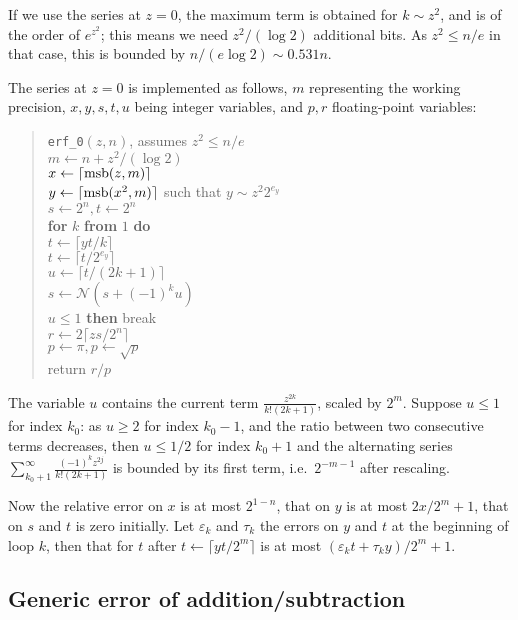 \documentclass[12pt]{amsart}
\def\q{\hspace*{5mm}}
\begin{document}
\medskip

If we use the series at $z=0$, the maximum term is obtained for
$k \sim z^2$, and is of the order of $e^{z^2}$; this means
we need $z^2/(\log 2)$ additional bits. As $z^2 \le n/e$ in that case,
this is bounded by $n/(e \log 2) \sim 0.531 n$.


The series at $z=0$ is implemented as follows, 
$m$ representing the working precision,
$x, y, s, t, u$ being integer variables, and $p, r$ floating-point
variables:
\begin{quote}
\verb|erf_0|$(z, n)$, assumes $z^2 \le n/e$ \\
$m \leftarrow n + z^2/(\log 2)$ \\
$x \leftarrow \lceil {\rm msb}(z, m) \rceil$ \\
$y \leftarrow \lceil {\rm msb}(x^2,m) \rceil$ such that $y \sim z^2 2^{e_y}$ \\
$s \leftarrow 2^n, t \leftarrow 2^n$ \\
{\bf for} $k$ {\bf from} $1$ {\bf do} \\
\q $t \leftarrow \lceil y t/k \rceil$ \\
\q $t \leftarrow \lceil t/2^{e_y} \rceil$ \\
\q $u \leftarrow \lceil t/(2k+1) \rceil$ \\
\q $s \leftarrow {\mathcal N}(s + (-1)^k u)$ \\
\q {\bf if} $u \le 1$ {\bf then} break \\
$r \leftarrow 2 \lceil z s/2^n \rceil$ \\
$p \leftarrow \pi, p \leftarrow \sqrt{p}$ \\
return $r/p$
\end{quote}
The variable $u$ contains the current term $\frac{z^{2k}}{k! (2k+1)}$,
scaled by $2^m$. Suppose $u \le 1$ for index $k_0$:
as $u \ge 2$ for index $k_0-1$, and the 
ratio between two consecutive terms decreases, then $u \le 1/2$ for index 
$k_0+1$ and the alternating series $\sum_{k_0+1}^{\infty} \frac{(-1)^k
z^{2j}}{k! (2k+1)}$
is bounded by its first term, i.e.~$2^{-m-1}$ after rescaling.

Now the relative error on $x$ is at most $2^{1-n}$,
that on $y$ is at most $2x/2^m + 1$,
that on $s$ and $t$ is zero initially.
Let $\varepsilon_k$ and $\tau_k$ the errors on $y$ and $t$
at the beginning of loop $k$,
then that for $t$ after $t \leftarrow \lceil y t/2^m \rceil$
is at most $(\varepsilon_k t + \tau_k y)/2^m + 1$.

\subsection{Generic error of addition/subtraction}\label{generic:sous}
\end{document}
